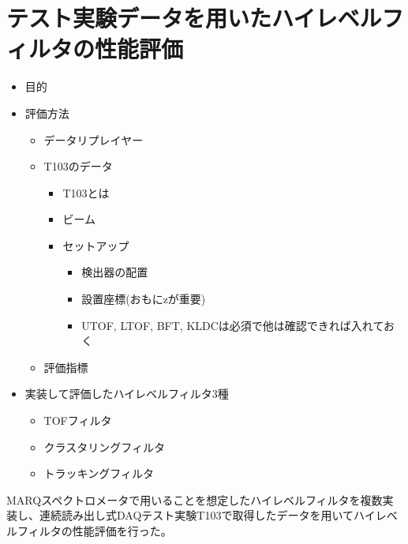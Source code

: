 \documentclass[../main.tex]{subfiles}
\begin{document}
\section{テスト実験データを用いたハイレベルフィルタの性能評価}
\label{sec:hlf-evaluation}
\begin{tcolorbox}
[
  title=執筆メモ,
  colback=yellow!8,
  colframe=black!30,
  breakable
]
\begin{itemize}
  \item 目的
  \item 評価方法
  \begin{itemize}
    \item データリプレイヤー
    \item T103のデータ
    \begin{itemize}
      \item T103とは
      \item ビーム
      \item セットアップ
      \begin{itemize}
        \item 検出器の配置
        \item 設置座標(おもにzが重要)
        \item UTOF, LTOF, BFT, KLDCは必須で他は確認できれば入れておく
      \end{itemize}
    \end{itemize}
    \item 評価指標
  \end{itemize}
  \item 実装して評価したハイレベルフィルタ3種
  \begin{itemize}
    \item TOFフィルタ
    \item クラスタリングフィルタ
    \item トラッキングフィルタ
  \end{itemize}
\end{itemize}
\end{tcolorbox}
MARQスペクトロメータで用いることを想定したハイレベルフィルタを複数実装し、連続読み出し式DAQテスト実験T103で取得したデータを用いてハイレベルフィルタの性能評価を行った。
\end{document}
